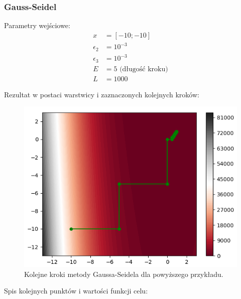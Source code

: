 \documentclass[a4paper,12pt]{article}
\begin{document}
\subsubsection{Gauss-Seidel}
Parametry wejściowe:
\begin{align*}
    x &= [-10; -10] \\
    \epsilon_{2} &= 10^{-3} \\
    \epsilon_{3} &= 10^{-3} \\
    E &= 5 \mbox{ (długość kroku)}\\
    L &= 1000
\end{align*}

Rezultat w postaci warstwicy i zaznaczonych kolejnych kroków:
\begin{figure}[H]
    \centering
    \includegraphics[width=\textwidth]{images/gs_plot4.png}
    \caption{Kolejne kroki metody Gaussa-Seidela dla powyższego przykładu.}
    \label{uml_gauss_seidel}
\end{figure}
\newpage
Spis kolejnych punktów i wartości funkcji celu:
\end{document}
